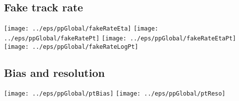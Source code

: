 \documentclass[landscape]{article}
\begin{document}
\subsection{Fake track rate}
 \texttt{[image: ../eps/ppGlobal/fakeRateEta]}
 \texttt{[image: ../eps/ppGlobal/fakeRatePt]}
 \texttt{[image: ../eps/ppGlobal/fakeRateEtaPt]}
 \texttt{[image: ../eps/ppGlobal/fakeRateLogPt]}
 \newpage

\subsection{Bias and resolution}
 \texttt{[image: ../eps/ppGlobal/ptBias]}
 \texttt{[image: ../eps/ppGlobal/ptReso]}
 \newpage
\end{document}

